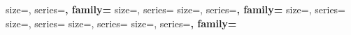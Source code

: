 
        {size=\Large,  series=\bfseries, family=\sffamily}
     {size=\normalsize, series=\normalfont}
   {size=\large,  series=\bfseries, family=\sffamily}
       {size=\small,  series=\normalfont}
    {size=\small,  series=\normalfont}
         {size=\small,  series=\normalfont}
  {size=\normalsize, series=\bfseries, family=\sffamily}


\newenvironment{uwbox}[1]{%
  \begin{block}{#1}%
}{%
  \end{block}%
}
